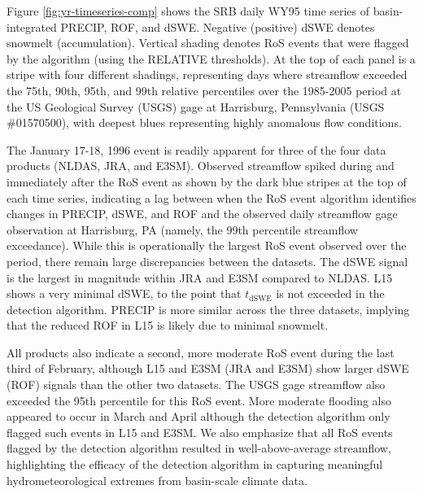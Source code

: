 \documentclass[nhess, manuscript]{copernicus}
\begin{document}
Figure \ref{fig:yr-timeseries-comp} shows the SRB daily WY95 time series of basin-integrated PRECIP, ROF, and dSWE.
Negative (positive) dSWE denotes snowmelt (accumulation).
Vertical shading denotes RoS events that were flagged by the algorithm (using the RELATIVE thresholds).
At the top of each panel is a stripe with four different shadings, representing days where streamflow exceeded the 75th, 90th, 95th, and 99th relative percentiles over the 1985-2005 period at the US Geological Survey (USGS) gage at Harrisburg, Pennsylvania (USGS \#01570500), with deepest blues representing highly anomalous flow conditions.

The January 17-18, 1996 event is readily apparent for three of the four data products (NLDAS, JRA, and E3SM).
Observed streamflow spiked during and immediately after the RoS event as shown by the dark blue stripes at the top of each time series, indicating a lag between when the RoS event algorithm identifies changes in PRECIP, dSWE, and ROF and the observed daily streamflow gage observation at Harrisburg, PA (namely, the 99th percentile streamflow exceedance).
While this is operationally the largest RoS event observed over the period, there remain large discrepancies between the datasets.
The dSWE signal is the largest in magnitude within JRA and E3SM compared to NLDAS.
L15 shows a very minimal dSWE, to the point that $t_\textrm{dSWE}$ is not exceeded in the detection algorithm.
PRECIP is more similar across the three datasets, implying that the reduced ROF in L15 is likely due to minimal snowmelt.

All products also indicate a second, more moderate RoS event during the last third of February, although L15 and E3SM (JRA and E3SM) show larger dSWE (ROF) signals than the other two datasets.
The USGS gage streamflow also exceeded the 95th percentile for this RoS event.
More moderate flooding also appeared to occur in March and April although the detection algorithm only flagged such events in L15 and E3SM.
We also emphasize that all RoS events flagged by the detection algorithm resulted in well-above-average streamflow, highlighting the efficacy of the detection algorithm in capturing meaningful hydrometeorological extremes from basin-scale climate data.
\end{document}
